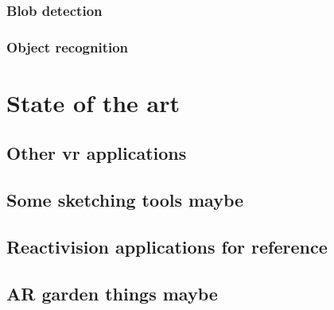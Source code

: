			\subsubsection{Blob detection}
			\subsubsection{Object recognition}

    \section{State of the art}\label{sec:SOTA}
		\subsection{Other vr applications}
		\subsection{Some sketching tools maybe}
		\subsection{Reactivision applications for reference}
		\subsection{AR garden things maybe}